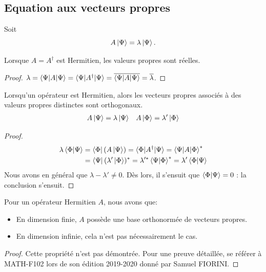 \documentclass[../notesdecours.tex]{subfiles}
\begin{document}
\subsection{Equation aux vecteurs propres}
Soit 
\begin{equation}
A\ket{\Psi} = \lambda\ket{\Psi}.
\end{equation}
\begin{Property}
Lorsque $A=A^\dag$ est Hermitien, les valeurs propres sont réelles.
\end{Property}
\begin{proof}
$\lambda = \braket{\Psi|A|\Psi} = \braket{\Psi|A^\dag|\Psi} = \overline{\braket{\Psi|A|\Psi}} = \overline{\lambda}$.
\end{proof}
\begin{Property}
Lorsqu'un opérateur est Hermitien, alors les vecteurs propres associés à des valeurs propres distinctes sont orthogonaux.
\begin{align}
A\ket{\Psi} &= \lambda\ket{\Psi}		&A\ket{\Phi} = \lambda'\ket{\Phi}
\end{align}
\end{Property}
\begin{proof}
\begin{align*}
\lambda\braket{\Phi|\Psi} &= \bra{\Phi}(A\ket{\Psi}) = \braket{\Phi|A^\dag|\Psi} = \braket{\Psi|A|\Phi}^*\\
&= \bra{\Psi}(\lambda'\ket{\Phi})^* = \lambda'^* \braket{\Psi|\Phi}^* = \lambda' \braket{\Phi|\Psi}
\end{align*}
Nous avons en général que $\lambda - \lambda' \neq 0$. Dès lors, il s'ensuit que $\braket{\Phi|\Psi} = 0$ : la conclusion s'ensuit.
\end{proof}
\begin{Property}
Pour un opérateur Hermitien $A$, nous avons que:
\begin{itemize}
\item En dimension finie, $A$ possède une base orthonormée de vecteurs propres.
\item En dimension infinie, cela n'est pas nécessairement le cas.
\end{itemize}
\end{Property}
\begin{proof}
Cette propriété n'est pas démontrée. Pour une preuve détaillée, se référer à MATH-F102 lors de son édition 2019-2020 donné par Samuel FIORINI.
\end{proof}
\end{document}
